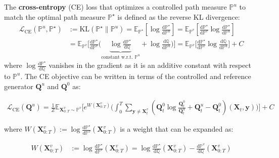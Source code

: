 \documentclass{article}
\begin{document}
\begin{definition}\label{def:discrete-cross-entropy}
    The \textbf{cross-entropy} (CE) loss that optimizes a controlled path measure $\mathbb{P}^u$ to match the optimal path measure $\mathbb{P}^\star$ is defined as the reverse KL divergence:
    \begin{align}
        \mathcal{L}_{\text{CE}}(\mathbb{P}^u, \mathbb{P}^\star)&:=\text{KL}(\mathbb{P}^\star\|\mathbb{P}^u)=\mathbb{E}_{\mathbb{P}^\star}\left[\log \frac{\mathrm{d}\mathbb{P}^\star}{\mathrm{d}\mathbb{P}^u}\right]=\mathbb{E}_{\mathbb{P}^v}\left[\frac{\mathrm{d}\mathbb{P}^\star }{\mathrm{d}\mathbb{P}^v}\log \frac{\mathrm{d}\mathbb{P}^\star}{\mathrm{d}\mathbb{P}^u}\right]\nonumber\\
        &=\mathbb{E}_{\mathbb{P}^v}\bigg[\frac{\mathrm{d}\mathbb{P}^\star }{\mathrm{d}\mathbb{P}^v}\bigg(\underbrace{\log \frac{\mathrm{d}\mathbb{P}^\star}{\mathrm{d}\mathbb{Q}}}_{\text{constant w.r.t. }\mathbb{P}^u}+\log \frac{\mathrm{d}\mathbb{Q}}{\mathrm{d}\mathbb{P}^u}\bigg)\bigg]=\mathbb{E}_{\mathbb{P}^v}\bigg[\frac{\mathrm{d}\mathbb{P}^\star }{\mathrm{d}\mathbb{P}^v}\log \frac{\mathrm{d}\mathbb{Q}}{\mathrm{d}\mathbb{P}^u}\bigg]+C
    \end{align}
    where $\log \frac{\mathrm{d}\mathbb{P}^\star}{\mathrm{d}\mathbb{Q}}$ vanishes in the gradient as it is an additive constant with respect to $\mathbb{P}^u$. The CE objective can be written in terms of the controlled and reference generator $\boldsymbol{Q}^u$ and $\boldsymbol{Q}^0$ as:
    \begin{small}
    \begin{align}
        \mathcal{L}_{\text{CE}}(\boldsymbol{Q}^u)=\frac{1}{Z}\mathbb{E}_{\boldsymbol{X}_{0:T}^v\sim\mathbb{P}^v}\bigg[e^{W(\boldsymbol{X}_{0:T}^v)}\bigg(\int_0^T\sum_{\boldsymbol{y}\neq \boldsymbol{X}^v_t}\left(\boldsymbol{Q}^0_t\log \frac{\boldsymbol{Q}^0_t}{\boldsymbol{Q}^u_t}+\boldsymbol{Q}_t^u-\boldsymbol{Q}_t^0\right)(\boldsymbol{X}_t,\boldsymbol{y})\bigg)\bigg]+C\label{eq:discrete-cross-entropy}
    \end{align}
    \end{small}
    where $W(\boldsymbol{X}_{0:T}^v):=\log \frac{\mathrm{d}\mathbb{P}^\star}{\mathrm{d}\mathbb{P}^v}(\boldsymbol{X}_{0:T}^v)$ is a weight that can be expanded as:
    \begin{small}
    \begin{align}
        W(\boldsymbol{X}_{0:T}^v)&:=\log\frac{\mathrm{d}\mathbb{P}^\star}{\mathrm{d}\mathbb{P}^v}(\boldsymbol{X}_{0:T}^v)=\log \frac{\mathrm{d}\mathbb{P}^\star}{\mathrm{d}\mathbb{Q}}(\boldsymbol{X}_{0:T}^v)-\frac{\mathrm{d}\mathbb{P}^v}{\mathrm{d}\mathbb{Q}}(\boldsymbol{X}_{0:T}^v)\nonumber\\

\end{align}
\end{small}
\end{definition}
\end{document}
